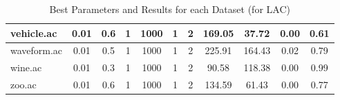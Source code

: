 \begin{table}[htbp]
\begin{tabular}{|l|c|c|c|c|c|c||c|c|c|c|}
		\hline
		vehicle.ac     & 0.01     & 0.6         & 1              & 1000                & 1             & 2             & 169.05         & 37.72          & 0.00           & 0.61           \\
		\hline
		waveform.ac    & 0.01     & 0.5         & 1              & 1000                & 1             & 2             & 225.91         & 164.43         & 0.02           & 0.79           \\
		\hline
		wine.ac        & 0.01     & 0.3         & 1              & 1000                & 1             & 2             & 90.58          & 118.38         & 0.00           & 0.99           \\
		\hline
		zoo.ac         & 0.01     & 0.6         & 1              & 1000                & 1             & 2             & 134.59         & 61.43          & 0.00           & 0.77           \\
		\hline
		\end{tabular}
	\caption{Best Parameters and Results for each Dataset (for LAC)}
	\label{tab:best_runs_for_each_db_lac}
\end{table}